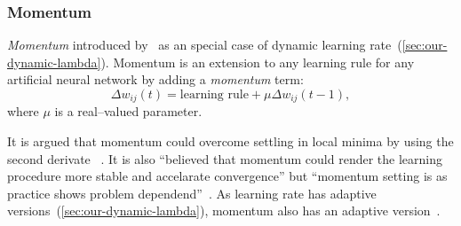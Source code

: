 \subsubsection{Momentum}
\label{sec:our-momentum}

\emph{Momentum} introduced by~\citet{jacobs1988increased} as an special case of dynamic learning rate~(\ref{sec:our-dynamic-lambda}). Momentum is an extension to any learning rule for any artificial neural network by adding a \emph{momentum} term: 
\begin{equation} 
  \Delta w_{ij}(t) = \mbox{learning rule} + \mu \Delta w_{ij}(t-1), \nonumber
\end{equation} 
where $\mu$ is a real--valued parameter. 

It is argued that momentum could overcome settling in local minima by using the second derivate ~\citep{phansalkar1994analysis}. It is also \enquote{believed that momentum could render the learning procedure more stable and accelarate convergence} but \enquote{momentum setting is as practice shows problem dependend}~\citep{riedmiller1993direct}. As learning rate has adaptive versions~(\ref{sec:our-dynamic-lambda}), momentum also has an adaptive version~\citep{miniani1990acceleration}. 
